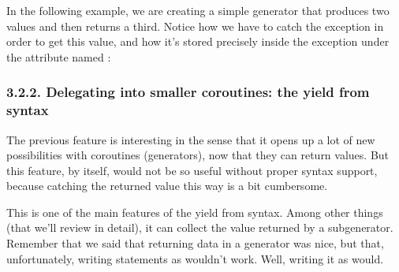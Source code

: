 \documentclass[a4paper,10pt,english]{sphinxmanual}
\begin{document}
In the following example, we are creating a simple generator that produces two values
and then returns a third. Notice how we have to catch the exception in order to get this
value, and how it’s stored precisely inside the exception under the attribute named :

\begin{sphinxVerbatim}[commandchars=\\\{\}]
 
     
     
     
  
    
   
    
\end{sphinxVerbatim}


\subsubsection{3.2.2. Delegating into smaller coroutines: the yield from syntax}
\label{\detokenize{chapters/7_generators/index:delegating-into-smaller-coroutines-the-yield-from-syntax}}
The previous feature is interesting in the sense that it opens up a lot of new possibilities
with coroutines (generators), now that they can return values. But this feature, by itself,
would not be so useful without proper syntax support, because catching the returned value
this way is a bit cumbersome.

This is one of the main features of the yield from syntax. Among other things (that we’ll
review in detail), it can collect the value returned by a sub\sphinxhyphen{}generator. Remember that we
said that returning data in a generator was nice, but that, unfortunately, writing statements
as  wouldn’t work. Well, writing it as  would.
\end{document}
